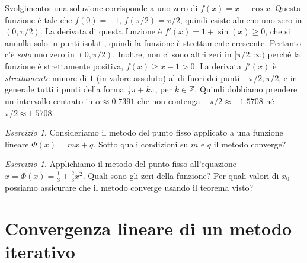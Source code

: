 \documentclass[a4paper]{report}
\theoremstyle{definiton}
\theoremstyle{remark}
\newtheorem{esercizio}[theorem]{Esercizio}
\begin{document}
Svolgimento: una soluzione corrisponde a uno zero di $f(x) = x - \cos x$. Questa funzione è tale che $f(0) = -1$, $f(\pi/2) = \pi/2$, quindi esiste almeno uno zero in $(0,\pi/2)$. La derivata di questa funzione è $f'(x) = 1 + \sin(x) \geq 0$, che si annulla solo in punti isolati, quindi la funzione è strettamente crescente. Pertanto c'è \emph{solo} uno zero in $(0,\pi/2)$. Inoltre, non ci sono altri zeri in $[\pi/2, \infty)$ perché la funzione è strettamente positiva, $f(x) \geq x - 1 > 0$. La derivata $f'(x)$ è \emph{strettamente} minore di $1$ (in valore assoluto) al di fuori dei punti $-\pi/2, \pi/2$, e in generale tutti i punti della forma $\frac12 \pi + k\pi$, per $k\in\mathbb{Z}$. Quindi dobbiamo prendere un intervallo centrato in $\alpha \approx 0.7391$ che non contenga $-\pi/2 \approx -1.5708$ né $\pi/2 \approx 1.5708$.

\begin{esercizio}
    Consideriamo il metodo del punto fisso applicato a una funzione lineare $\Phi(x) = mx + q$. Sotto quali condizioni su $m$ e $q$ il metodo converge?
\end{esercizio}
\begin{esercizio}
    Applichiamo il metodo del punto fisso all'equazione $x = \Phi(x) = \frac13 + \frac23 x^2$. Quali sono gli zeri della funzione? Per quali valori di $x_0$ possiamo assicurare che il metodo converge usando il teorema visto?
\end{esercizio}

\section{Convergenza lineare di un metodo iterativo}
\end{document}

